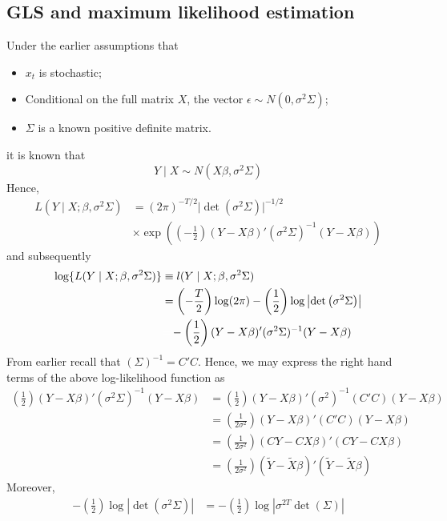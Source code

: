 \documentclass[10pt,handout,english]{beamer}
\begin{document}
\subsection{GLS and maximum likelihood estimation}
\begin{frame}[allowframebreaks]
Under the earlier assumptions that 
\begin{itemize}
\item $x_t$ is stochastic;
\item Conditional on the full matrix $X$, the vector $\epsilon\sim N(0,\sigma^2\Sigma)$;
\item $\Sigma$ is a known positive definite matrix. 
\end{itemize}
it is known that 
\[
Y\mid X\sim N(X\beta,\sigma^2\Sigma)
\]
Hence,
\begin{align*}
L(Y\mid X;\beta,\sigma^2\Sigma)&=(2\pi)^{-T/2}\lvert\det{(\sigma^2\Sigma)}\rvert^{-1/2}\\
&\times\exp\left(\left(-\frac{1}{2}\right)(Y-X\beta)'(\sigma^2\Sigma)^{-1}(Y-X\beta)\right)
\end{align*}
and subsequently
\begingroup
\allowdisplaybreaks
\begin{align*}
\log\{L(Y\mid X;\beta,\sigma^2\Sigma)\}&\equiv l(Y\mid X;\beta,\sigma^2\Sigma)\\
&=\left(-\frac{T}{2}\right)\log(2\pi)-\left(\frac{1}{2}\right)\log\left\lvert\det\left(\sigma^2\Sigma\right)\right\rvert\\
&\textcolor{white}{=}-\left(\frac{1}{2}\right)(Y-X\beta)'(\sigma^2\Sigma)^{-1}(Y-X\beta)
\end{align*}
\endgroup
From earlier recall that $(\Sigma)^{-1}=C'C$. Hence, we may express the right hand terms of the above log-likelihood function as 
\begin{align*}
\left(\frac{1}{2}\right)(Y-X\beta)'(\sigma^2\Sigma)^{-1}(Y-X\beta)&=\left(\frac{1}{2}\right)(Y-X\beta)'(\sigma^2)^{-1}(C'C)(Y-X\beta)\\
&=\left(\frac{1}{2\sigma^2}\right)(Y-X\beta)'(C'C)(Y-X\beta)\\
&=\left(\frac{1}{2\sigma^2}\right)(CY-CX\beta)'(CY-CX\beta)\\
&=\left(\frac{1}{2\sigma^2}\right)(\tilde{Y}-\tilde{X}\beta)'(\tilde{Y}-\tilde{X}\beta)
\end{align*}
Moreover,
\begingroup
\allowdisplaybreaks
\begin{align*}
-\left(\frac{1}{2}\right)\log\left\lvert\det\left(\sigma^2\Sigma\right)\right\rvert&=-\left(\frac{1}{2}\right)\log\left\lvert\sigma^{2T}\det\left( \Sigma\right)\right\rvert\\

\end{align*}
\end{frame}
\end{document}

